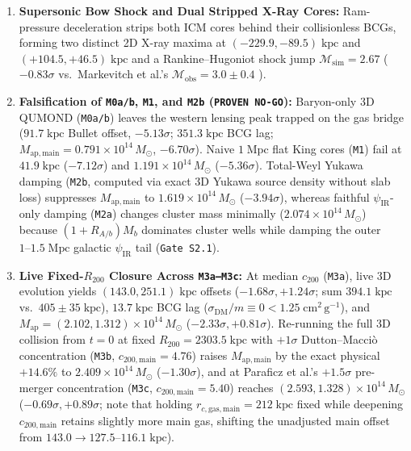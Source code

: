 \documentclass[11pt,a4paper]{article}
\begin{document}
\begin{enumerate}
    \item \textbf{Supersonic Bow Shock and Dual Stripped X-Ray Cores:} Ram-pressure deceleration strips both ICM cores behind their collisionless BCGs, forming two distinct 2D X-ray maxima at $(-229.9, -89.5)\;\mathrm{kpc}$ and $(+104.5, +46.5)\;\mathrm{kpc}$ and a Rankine--Hugoniot shock jump $\mathcal{M}_{\mathrm{sim}} = 2.67$ ($-0.83\sigma$ vs.\ Markevitch et al.'s $\mathcal{M}_{\mathrm{obs}} = 3.0 \pm 0.4$ \cite{Markevitch2004}).
    \item \textbf{Falsification of \texttt{M0a/b}, \texttt{M1}, and \texttt{M2b} (\texttt{PROVEN NO-GO}):} Baryon-only 3D QUMOND (\texttt{M0a/b}) leaves the western lensing peak trapped on the gas bridge ($91.7\;\mathrm{kpc}$ Bullet offset, $-5.13\sigma$; $351.3\;\mathrm{kpc}$ BCG lag; $M_{\mathrm{ap,main}} = 0.791\times 10^{14}\,M_\odot$, $-6.70\sigma$). Naive $1\;\mathrm{Mpc}$ flat King cores (\texttt{M1}) fail at $41.9\;\mathrm{kpc}$ ($-7.12\sigma$) and $1.191\times 10^{14}\,M_\odot$ ($-5.36\sigma$). Total-Weyl Yukawa damping (\texttt{M2b}, computed via exact 3D Yukawa source density without slab loss) suppresses $M_{\mathrm{ap,main}}$ to $1.619\times 10^{14}\,M_\odot$ ($-3.94\sigma$), whereas faithful $\psi_{\mathrm{IR}}$-only damping (\texttt{M2a}) changes cluster mass minimally ($2.074\times 10^{14}\,M_\odot$) because $(1+R_{A/b})M_b$ dominates cluster wells while damping the outer $1\text{--}1.5\;\mathrm{Mpc}$ galactic $\psi_{\mathrm{IR}}$ tail (\texttt{Gate S2.1}).
    \item \textbf{Live Fixed-$R_{200}$ Closure Across \texttt{M3a--M3c}:} At median $c_{200}$ (\texttt{M3a}), live 3D evolution yields $(143.0, 251.1)\;\mathrm{kpc}$ offsets ($-1.68\sigma, +1.24\sigma$; sum $394.1\;\mathrm{kpc}$ vs.\ $405 \pm 35\;\mathrm{kpc}$), $13.7\;\mathrm{kpc}$ BCG lag ($\sigma_{\mathrm{DM}}/m \equiv 0 < 1.25\;\mathrm{cm^2\,g^{-1}}$), and $M_{\mathrm{ap}} = (2.102, 1.312)\times 10^{14}\,M_\odot$ ($-2.33\sigma, +0.81\sigma$). Re-running the full 3D collision from $t = 0$ at fixed $R_{200} = 2303.5\;\mathrm{kpc}$ with $+1\sigma$ Dutton--Macci\`o concentration (\texttt{M3b}, $c_{200,\mathrm{main}} = 4.76$) raises $M_{\mathrm{ap,main}}$ by the exact physical $+14.6\%$ to $2.409\times 10^{14}\,M_\odot$ ($-1.30\sigma$), and at Paraficz et al.'s \cite{Paraficz2016} $+1.5\sigma$ pre-merger concentration (\texttt{M3c}, $c_{200,\mathrm{main}} = 5.40$) reaches $(2.593, 1.328)\times 10^{14}\,M_\odot$ ($-0.69\sigma, +0.89\sigma$; note that holding $r_{c,\mathrm{gas,main}} = 212\;\mathrm{kpc}$ fixed while deepening $c_{200,\mathrm{main}}$ retains slightly more main gas, shifting the unadjusted main offset from $143.0 \to 127.5\text{--}116.1\;\mathrm{kpc}$).
\end{enumerate}
\end{document}

